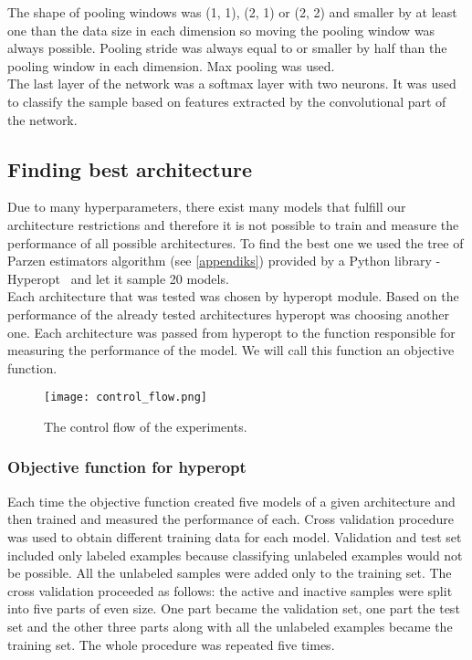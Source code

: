 \documentclass[a4paper,10pt]{report}
\begin{document}
      The shape of pooling windows was (1, 1), (2, 1) or (2, 2) and smaller by at least one than the data size in each dimension so moving the pooling window was always possible. Pooling stride was always equal to or smaller by half than the pooling window in each dimension. Max pooling was used.\\
      
      The last layer of the network was a softmax layer with two neurons. It was used to classify the sample based on features extracted by the convolutional part of the network.\\
      
	\subsection{Finding best architecture}
	Due to many hyperparameters, there exist many models that fulfill our architecture restrictions and therefore it is not possible to train and measure the performance of all possible architectures. To find the best one we used the tree of Parzen estimators algorithm (see \ref{appendiks}) provided by a Python library - Hyperopt~\cite{HYPEROPT} and let it sample 20 models.\\
		
	Each architecture that was tested was chosen by hyperopt module. Based on the performance of the already tested architectures hyperopt was choosing another one. Each architecture was passed from hyperopt to the function responsible for measuring the performance of the model. We will call this function an objective function.\\
	
	 \begin{figure}[h!]
	  \centering
	  \texttt{[image: control\_flow.png]}
	  \caption{The control flow of the experiments.}
	  \label{fig:control_flow}
	\end{figure} 
	
	\subsubsection{Objective function for hyperopt}
	Each time the objective function created five models of a given architecture and then trained and measured the performance of each. Cross validation procedure was used to obtain different training data for each model. Validation and test set included only labeled examples because classifying unlabeled examples would not be possible. All the unlabeled samples were added only to the training set. The cross validation proceeded as follows: the active and inactive samples were split into five parts of even size. One part became the validation set, one part the test set and the other three parts along with all the unlabeled examples became the training set. The whole procedure was repeated five times.\\
	
\end{document}
